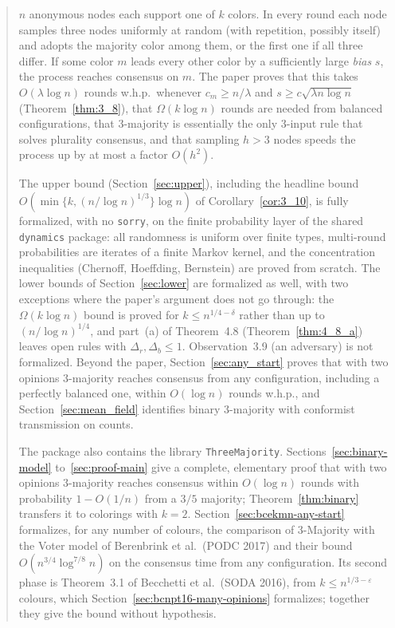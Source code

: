 \begin{abstract}
\noindent
$n$ anonymous nodes each support one of $k$ colors. In every round each node
samples three nodes uniformly at random (with repetition, possibly itself)
and adopts the majority color among them, or the first one if all three
differ. If some color $m$ leads every other color by a sufficiently large
\emph{bias} $s$, the process reaches consensus on $m$. The paper proves that
this takes $O(\lambda\log n)$ rounds w.h.p.\ whenever $c_m \ge n/\lambda$
and $s \ge c\sqrt{\lambda n\log n}$ (Theorem~\ref{thm:3_8}), that
$\Omega(k\log n)$ rounds are needed from balanced configurations, that
3-majority is essentially the only 3-input rule that solves plurality
consensus, and that sampling $h > 3$ nodes speeds the process up by at most
a factor $O(h^2)$.

The upper bound (Section~\ref{sec:upper}), including the headline bound
$O(\min\{k,(n/\log n)^{1/3}\}\log n)$ of Corollary~\ref{cor:3_10}, is fully
formalized, with no
\texttt{sorry}, on the finite probability layer of the shared
\texttt{dynamics} package: all randomness is uniform over finite types,
multi-round probabilities are iterates of a finite Markov kernel, and the
concentration inequalities (Chernoff, Hoeffding, Bernstein) are proved from
scratch. The lower bounds of Section~\ref{sec:lower} are formalized as well,
with two exceptions where the paper's argument does not go through: the
$\Omega(k\log n)$ bound is proved for $k \le n^{1/4-\delta}$ rather than up to
$(n/\log n)^{1/4}$, and part~(a) of Theorem~4.8 (Theorem~\ref{thm:4_8_a}) leaves open rules
with $\Delta_r, \Delta_b \le 1$. Observation~3.9 (an adversary) is not
formalized. Beyond the paper, Section~\ref{sec:any_start} proves that with two opinions
3-majority reaches consensus from any configuration, including a perfectly balanced one, within
$O(\log n)$ rounds w.h.p., and Section~\ref{sec:mean_field} identifies binary 3-majority with
conformist transmission on counts.

The package also contains the library \texttt{ThreeMajority}. Sections~\ref{sec:binary-model}
to~\ref{sec:proof-main} give a complete, elementary proof that with two opinions 3-majority
reaches consensus within $O(\log n)$ rounds with probability $1-O(1/n)$ from a $3/5$ majority;
Theorem~\ref{thm:binary} transfers it to colorings with $k = 2$.
Section~\ref{sec:bcekmn-any-start} formalizes, for any number of colours, the comparison of
3-Majority with the Voter model of Berenbrink et al.\ (PODC 2017) and their bound
$O(n^{3/4}\log^{7/8}n)$ on the consensus time from any configuration. Its second phase is
Theorem~3.1 of Becchetti et al.\ (SODA 2016), from $k\le n^{1/3-\varepsilon}$ colours, which
Section~\ref{sec:bcnpt16-many-opinions} formalizes; together they give the bound without
hypothesis.
\end{abstract}

